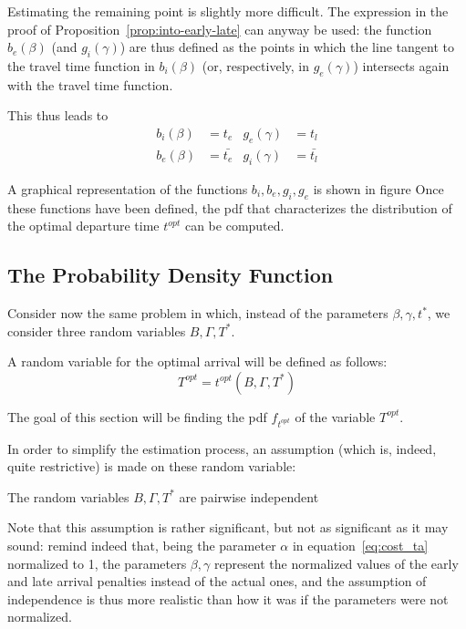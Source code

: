 Estimating the remaining point is slightly more difficult.
The expression in the proof of Proposition~\ref{prop:into-early-late} can anyway be used:
the function \(b_e(\beta)\) (and \(g_i(\gamma)\))
are thus defined as the points in which the line tangent to the travel time function in \(b_i(\beta)\) (or, respectively, in \(g_e(\gamma)\)) intersects again with the travel time function.

This thus leads to
\begin{align*}
  b_i(\beta) & = t_e & g_e(\gamma) & = t_l \\
  b_e(\beta) & = \bar{t_e} & g_i(\gamma) & = \bar{t_l}
\end{align*}

A graphical representation of the functions \(b_i, b_e, g_i, g_e\) is shown in figure
Once these functions have been defined,
the pdf that characterizes the distribution of the optimal departure time \(t^{opt}\) can be computed.

\subsection{The Probability Density Function}

Consider now the same problem in which,
instead of the parameters \(\beta, \gamma, t^*\),
we consider three random variables \(B, \Gamma, T^*\).

A random variable for the optimal arrival will be defined as follows:
\begin{equation}
  \label{eq:rv-opt-arr}
  T^{opt} = t^{opt}(B, \Gamma, T^*)
\end{equation}

The goal of this section will be finding the pdf \(f_{t^{opt}}\) of the variable \(T^{opt}\).

In order to simplify the estimation process, an assumption (which is, indeed, quite restrictive)
is made on these random variable:

\begin{assumption}
  The random variables \(B, \Gamma, T^*\) are pairwise independent
\end{assumption}

Note that this assumption is rather significant,
but not as significant as it may sound:
remind indeed that, being the parameter \(\alpha\) in equation~\eqref{eq:cost_ta} normalized to 1,
the parameters \(\beta, \gamma\) represent the normalized values of the early and late arrival penalties instead of the actual ones,
and the assumption of independence is thus more realistic than how it was if the parameters were not normalized.

